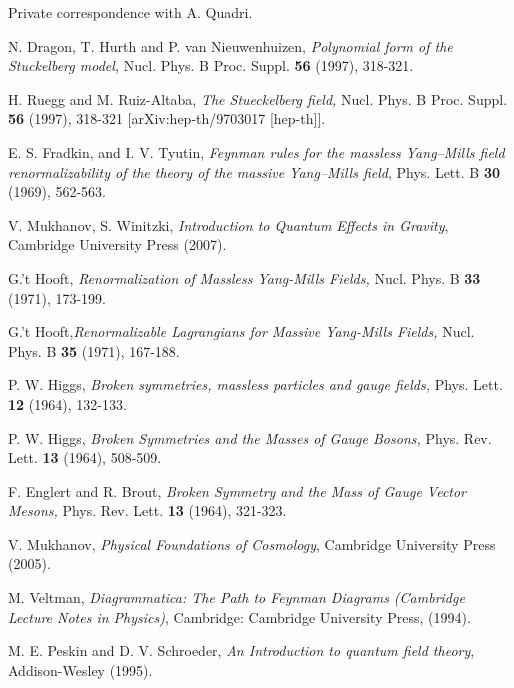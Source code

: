 \documentclass{article}
\begin{document}
\begin{thebibliography}{9}
Private correspondence with A. Quadri. 

N. Dragon, T. Hurth and P. van Nieuwenhuizen,
\textit{Polynomial form of the Stuckelberg model,}
Nucl. Phys. B Proc. Suppl. \textbf{56} (1997), 318-321.

H. Ruegg and M. Ruiz-Altaba, \textit{The Stueckelberg field,} Nucl. Phys. B Proc. Suppl. \textbf{56} (1997), 318-321 
[arXiv:hep-th/9703017 [hep-th]].


 
E. S. Fradkin, and I. V. Tyutin, \textit{Feynman rules for the massless Yang–Mills field renormalizability of the theory of the massive Yang–Mills field}, Phys. Lett. B \textbf{30} (1969), 562-563.


 V. Mukhanov, S. Winitzki, \textit{Introduction to Quantum Effects in Gravity}, Cambridge University Press (2007).

 
G.'t Hooft, \textit{Renormalization of Massless Yang-Mills Fields,} Nucl. Phys. B \textbf{33} (1971), 173-199. 

G.'t Hooft,\textit{Renormalizable Lagrangians for Massive Yang-Mills Fields,}
Nucl. Phys. B \textbf{35} (1971), 167-188.

P. W. Higgs, \textit{Broken symmetries, massless particles and gauge fields,} Phys. Lett. \textbf{12} (1964), 132-133.

P. W. Higgs, \textit{Broken Symmetries and the Masses of Gauge Bosons,} Phys. Rev. Lett. \textbf{13} (1964), 508-509.

F. Englert and R. Brout, \textit{Broken Symmetry and the Mass of Gauge Vector Mesons,} Phys. Rev. Lett. \textbf{13} (1964), 321-323.

 V. Mukhanov, \textit{Physical Foundations of Cosmology}, Cambridge University Press (2005).
 
 M. Veltman, \textit{Diagrammatica: The Path to Feynman Diagrams (Cambridge Lecture Notes in Physics)}, Cambridge: Cambridge University Press, (1994).
 
M. E. Peskin and D. V. Schroeder, \textit{An Introduction to quantum field theory}, Addison-Wesley (1995).



\end{thebibliography}
\end{document}
